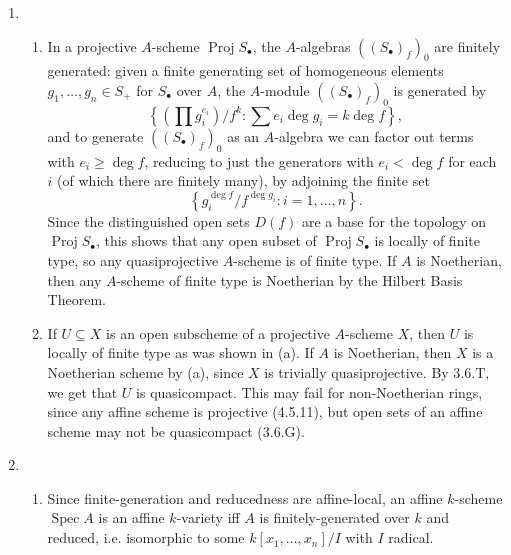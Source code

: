 \documentclass{report}
\DeclareMathOperator{\Spec}{Spec}
\DeclareMathOperator{\Proj}{Proj}
\begin{document}
\begin{enumerate}[label=\textbf{5.3.\Alph*.}]
	\item
	      \begin{enumerate}[label=(\alph*)]
		      \item In a projective $A$-scheme $\Proj S_\bullet$, the $A$-algebras
		            $((S_\bullet)_f)_0$ are finitely generated: given a finite
		            generating set of homogeneous elements $g_1,\ldots,g_n\in S_+$
		            for $S_\bullet$ over $A$, the $A$-module $((S_\bullet)_f)_0$ is
		            generated by
		            \begin{equation*}
			            \left\{\left(\prod g_i^{e_i}\right)/f^k :
			            \sum e_i\deg g_i=k\deg f\right\},
		            \end{equation*}
		            and to generate $((S_\bullet)_f)_0$ as an $A$-algebra we can
		            factor out terms with $e_i\ge\deg f$, reducing to just the
		            generators with $e_i<\deg f$ for each $i$ (of which there are
		            finitely many), by adjoining the finite set
		            \begin{equation*}
			            \left\{g_i^{\deg f}/f^{\deg g_i}:i=1,\ldots,n\right\}.
		            \end{equation*}
		            Since the distinguished open sets $D(f)$ are a base for the
		            topology on $\Proj S_\bullet$, this shows that any open subset
		            of $\Proj S_\bullet$ is locally of finite type, so any
		            quasiprojective $A$-scheme is of finite type. If $A$ is
		            Noetherian, then any $A$-scheme of finite type is Noetherian by
		            the Hilbert Basis Theorem.

		      \item If $U\subseteq X$ is an open subscheme of a projective
		            $A$-scheme $X$, then $U$ is locally of finite type as was shown
		            in (a). If $A$ is Noetherian, then $X$ is a Noetherian scheme by
		            (a), since $X$ is trivially quasiprojective. By 3.6.T, we get
		            that $U$ is quasicompact. This may fail for non-Noetherian
		            rings, since any affine scheme is projective (4.5.11), but open
		            sets of an affine scheme may not be quasicompact (3.6.G).
	      \end{enumerate}

	\item
	      \begin{enumerate}[label=(\alph*)]
		      \item Since finite-generation and reducedness are affine-local, an
		            affine $k$-scheme $\Spec A$ is an affine $k$-variety iff $A$ is
		            finitely-generated over $k$ and reduced, i.e. isomorphic to some
		            $k[x_1,\ldots,x_n]/I$ with $I$ radical.


\end{enumerate}
\end{enumerate}
\end{document}
